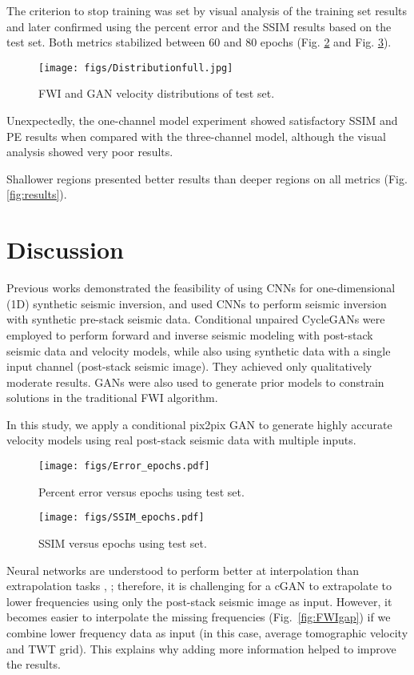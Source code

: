 \documentclass[conference]{IEEEtran}
\begin{document}
The criterion to stop training was set by visual analysis of the training set results and later confirmed using the percent error and the SSIM results based on the test set. Both metrics stabilized between 60 and 80 epochs (Fig. \ref{fig:PE} and Fig. \ref{fig:SSIM}).

\begin{figure}[bth]
 \centering
 \texttt{[image: figs/Distributionfull.jpg]}
  \caption{FWI and GAN velocity distributions of test set.}
 \label{fig:vel_distrib}
\end{figure}


Unexpectedly, the one-channel model experiment showed satisfactory SSIM and PE results when compared with the three-channel model, although the visual analysis showed very poor results. 

Shallower regions presented better results than deeper regions on all metrics (Fig.  \ref{fig:results}).

\section{Discussion}

Previous works \cite{Puzyrev2019SeismicIW} demonstrated the feasibility of using CNNs for one-dimensional (1D) synthetic seismic inversion, and \cite{Wu2018InversionNetAA} used CNNs to perform seismic inversion with synthetic pre-stack seismic data. Conditional unpaired CycleGANs\cite{Mosser2018RapidSD} were employed to perform forward and inverse seismic modeling with post-stack seismic data and velocity models, while also using synthetic data with a single input channel (post-stack seismic image). They achieved only qualitatively moderate results.
GANs were also used to generate prior models to constrain solutions in the traditional FWI algorithm\cite{Mosser2020}.

In this study, we apply a conditional pix2pix GAN to generate highly accurate velocity models using real post-stack seismic data with multiple inputs.
\begin{figure}[t]
 \centering
 \texttt{[image: figs/Error\_epochs.pdf]}
  \caption{Percent error versus epochs using test set.}
 \label{fig:PE}
\end{figure}

\begin{figure}[h]
 \centering
 \texttt{[image: figs/SSIM\_epochs.pdf]}
  \caption{SSIM versus epochs using test set.}
 \label{fig:SSIM}
\end{figure}
Neural networks are understood to perform better at interpolation than extrapolation tasks \cite{Barnard1992ExtrapolationAI}, \cite{Xu2020HowNN}; therefore, it is challenging for a cGAN to extrapolate to lower frequencies using only the post-stack seismic image as input. However, it becomes easier to interpolate the missing frequencies (Fig.~\ref{fig:FWIgap}) if we combine lower frequency data as input (in this case, average tomographic velocity and TWT grid). This explains why adding more information helped to improve the results.
\end{document}
